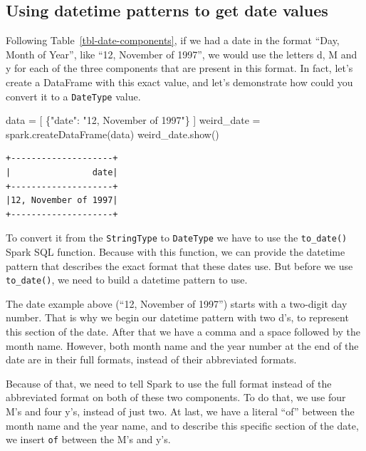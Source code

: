 \documentclass[
  11pt,
  letterpaper,
  DIV=11,
  numbers=noendperiod]{scrreprt}
\newenvironment{Shaded}{\begin{snugshade}}{\end{snugshade}}
\newcommand{\NormalTok}[1]{\textcolor[rgb]{0.00,0.23,0.31}{#1}}
\newcommand{\OperatorTok}[1]{\textcolor[rgb]{0.37,0.37,0.37}{#1}}
\newcommand{\StringTok}[1]{\textcolor[rgb]{0.13,0.47,0.30}{#1}}
\begin{document}
\subsection{Using datetime patterns to get date
values}\label{using-datetime-patterns-to-get-date-values}

Following Table~\ref{tbl-date-components}, if we had a date in the
format ``Day, Month of Year'', like ``12, November of 1997'', we would
use the letters d, M and y for each of the three components that are
present in this format. In fact, let's create a DataFrame with this
exact value, and let's demonstrate how could you convert it to a
\texttt{DateType} value.

\begin{Shaded}
\begin{Highlighting}[]
\NormalTok{data }\OperatorTok{=}\NormalTok{ [ \{}\StringTok{"date"}\NormalTok{: }\StringTok{"12, November of 1997"}\NormalTok{\} ]}
\NormalTok{weird\_date }\OperatorTok{=}\NormalTok{ spark.createDataFrame(data)}
\NormalTok{weird\_date.show()}
\end{Highlighting}
\end{Shaded}

\begin{verbatim}
+--------------------+
|                date|
+--------------------+
|12, November of 1997|
+--------------------+
\end{verbatim}

To convert it from the \texttt{StringType} to \texttt{DateType} we have
to use the \texttt{to\_date()} Spark SQL function. Because with this
function, we can provide the datetime pattern that describes the exact
format that these dates use. But before we use \texttt{to\_date()}, we
need to build a datetime pattern to use.

The date example above (``12, November of 1997'') starts with a
two-digit day number. That is why we begin our datetime pattern with two
d's, to represent this section of the date. After that we have a comma
and a space followed by the month name. However, both month name and the
year number at the end of the date are in their full formats, instead of
their abbreviated formats.

Because of that, we need to tell Spark to use the full format instead of
the abbreviated format on both of these two components. To do that, we
use four M's and four y's, instead of just two. At last, we have a
literal ``of'' between the month name and the year name, and to describe
this specific section of the date, we insert
\texttt{\textquotesingle{}of\textquotesingle{}} between the M's and y's.
\end{document}
